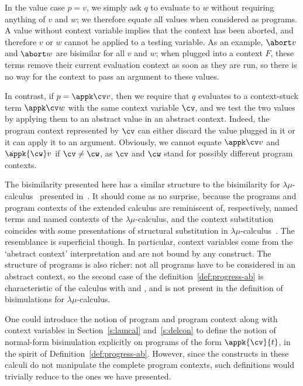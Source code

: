 \documentclass{lmcs}
\theoremstyle{defC}
\begin{document}
In the value case $p = v$, we simply ask $q$ to evaluate to $w$ without
requiring anything of $v$ and $w$; we therefore equate all values when
considered as programs. A value without context variable implies that the
context has been aborted, and therefore $v$ or $w$ cannot be applied to a
testing variable. As an example, $\abort v$ and $\abort w$ are bisimilar for all
$v$ and $w$; when plugged into a context $F$, these terms remove their current
evaluation context as soon as they are run, so there is no way for the context
to pass an argument to these values.

In contrast, if $p=\appk \cv v$, then we require that $q$ evaluates to a
context-stuck term $\appk \cv w$ with the same context variable $\cv$, and we
test the two values by applying them to an abstract value in an abstract
context. Indeed, the program context represented by $\cv$ can either discard the
value plugged in it or it can apply it to an argument. Obviously, we cannot
equate $\appk \cv v$ and $\appk {\cw} v$ if $\cv \neq \cw$, as $\cv$ and $\cw$
stand for possibly different program contexts.

The bisimilarity presented here has a similar structure to the
bisimilarity for $\lambda\mu$-calculus~\cite{Parigot:LPAR92} presented
in~\cite{Stoevring-Lassen:POPL07}. It should come as no surprise,
because the programs and program contexts of the extended calculus are
reminiscent of, respectively, named terms and named contexts of the
$\lambda\mu$-calculus, and the context substitution coincides with
some presentations of structural substitution in
$\lambda\mu$-calculus~\cite{Ariola-al:HOSC07,Stoevring-Lassen:POPL07}.
The resemblance is superficial though. In particular, context
variables come from the `abstract context' interpretation and are not
bound by any construct. The structure of programs is also richer: not
all programs have to be considered in an abstract context, so the
second case of the definition~\ref{def:progress-ab} is characteristic
of the calculus with \textcallcc{} and \textabort{}, and is not
present in the definition of bisimulations for $\lambda\mu$-calculus.

\begin{rem}%
  \label{r:pgms-in-gen}
  One could introduce the notion of program and program context along
  with context variables in Section~\ref{s:lamcal} and~\ref{s:delcon}
  to define the notion of normal-form bisimulation explicitly on
  programs of the form $\appk{\cv}{t}$, in the spirit of
  Definition~\ref{def:progress-ab}. However, since the constructs in
  these calculi do not manipulate the complete program contexts, such
  definitions would trivially reduce to the ones we have presented.
\end{rem}
\end{document}
